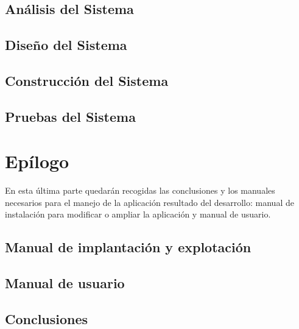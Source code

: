 \documentclass[a4paper,11pt]{book}
\begin{document}
\chapter{Análisis del Sistema}


\chapter{Diseño del Sistema}


\chapter{Construcción del Sistema}


\chapter{Pruebas del Sistema}


\part{Epí­logo}
\null\vfill
\noindent En esta última parte quedarán recogidas las conclusiones y los manuales necesarios para el manejo de la aplicación resultado del desarrollo: manual de instalación para modificar o ampliar la aplicación y manual de usuario.\\

\chapter{Manual de implantación y explotación}


\chapter{Manual de usuario}


\chapter{Conclusiones}


\chapter*{\bibname}

\begingroup
  \def\chapter*#1{}
\renewcommand{\bibname}{}
\nocite{*}



\backmatter


\end{document}
